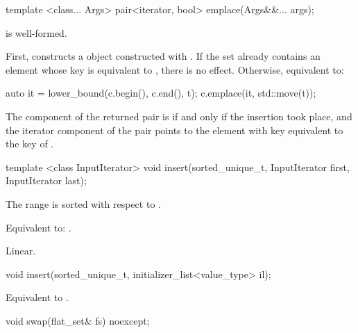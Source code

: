 \begin{codeblock}
\begin{codeblock}
\begin{codeblock}
\begin{addedblock}
%
\begin{itemdecl}
template <class... Args> pair<iterator, bool> emplace(Args&&... args);
\end{itemdecl}

\begin{itemdescr}
\pnum \constraints {} is well-formed.

\pnum
\effects
First, constructs a  object  constructed
with .  If the set already contains an
element whose key is equivalent to , there is no effect.  Otherwise,
equivalent to:
\begin{codeblock}
auto it = lower_bound(c.begin(), c.end(), t);
c.emplace(it, std::move(t));
\end{codeblock}

\pnum
\returns
The  component of the returned pair is  if and only if
the insertion took place, and the iterator component of the pair points to the
element with key equivalent to the key of .
\end{itemdescr}

%
\begin{itemdecl}
template <class InputIterator>
  void insert(sorted_unique_t, InputIterator first, InputIterator last);
\end{itemdecl}

\begin{itemdescr}
\pnum \expects
The range  is sorted with respect to .

\pnum \effects Equivalent to: .

\pnum \complexity Linear.
\end{itemdescr}

%
\begin{itemdecl}
void insert(sorted_unique_t, initializer_list<value_type> il);
\end{itemdecl}

\begin{itemdescr}
\pnum \effects Equivalent to .
\end{itemdescr}

%
\begin{itemdecl}
void swap(flat_set& fs) noexcept;
\end{itemdecl}


\end{addedblock}
\end{codeblock}
\end{codeblock}
\end{codeblock}
